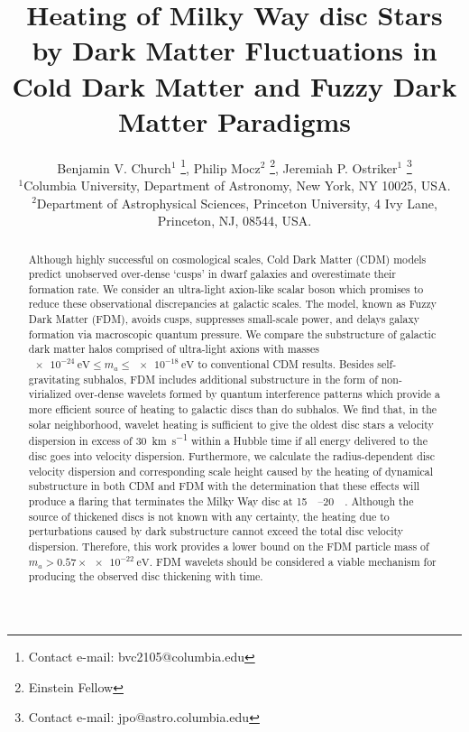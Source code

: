 \documentclass[usenatbib]{mnras}
\newcommand{\squote}[1]{\lq #1\rq}
\newcommand{\poweV}[1]{\SI{e#1}{\electronvolt}}
\begin{document}
\title[Dark Matter Heating]{Heating of Milky Way disc Stars by Dark Matter Fluctuations in Cold Dark Matter and Fuzzy Dark Matter Paradigms}
\author[B. V. Church and J. P. Ostriker]{
Benjamin V. Church$^{1}$ \thanks{Contact e-mail: bvc2105@columbia.edu}, Philip Mocz$^{2}$ \thanks{Einstein Fellow},
Jeremiah P. Ostriker$^{1}$ \thanks{Contact e-mail: jpo@astro.columbia.edu}
\\
$^{1}$Columbia University, Department of Astronomy, New York, NY 10025, USA.
\\
$^{2}$Department of Astrophysical Sciences, Princeton University, 4 Ivy Lane, Princeton, NJ, 08544, USA.}
\maketitle
\begin{abstract}
Although highly successful on  cosmological scales, Cold Dark Matter (CDM) models predict unobserved over-dense \squote{cusps} in dwarf galaxies and overestimate their formation rate. We consider an ultra-light axion-like scalar boson which promises to reduce these observational discrepancies at galactic scales. The model, known as Fuzzy Dark Matter (FDM), avoids cusps, suppresses small-scale power, and delays galaxy formation via macroscopic quantum pressure. We compare the substructure of galactic dark matter halos comprised of ultra-light axions with masses $\poweV{-24} \leq m_a \leq \poweV{-18}$ to conventional CDM results. Besides self-gravitating subhalos, FDM includes additional substructure in the form of non-virialized over-dense wavelets formed by quantum interference patterns which provide a more efficient source of heating to galactic discs than do subhalos. We find that, in the solar neighborhood, wavelet heating is sufficient to give the oldest disc stars a velocity dispersion in excess of \SI{30}{\kilo\meter\per\second} within a Hubble time if all energy delivered to the disc goes into velocity dispersion. 
Furthermore, we calculate the radius-dependent disc velocity dispersion and corresponding scale height caused by the heating of dynamical substructure in both CDM and FDM with the determination that these effects will produce a flaring that terminates the Milky Way disc at \SIrange{15}{20}{\kilo \parsec}. Although the source of thickened discs is not known with any certainty, the heating due to perturbations caused by dark substructure cannot exceed the total disc velocity dispersion. Therefore, this work provides a lower bound on the FDM particle mass of $m_a > 0.57 \times \SI{e-22}{\electronvolt}$. FDM wavelets should be considered a viable mechanism for producing the observed disc thickening with time.
\end{abstract}
\end{document}
